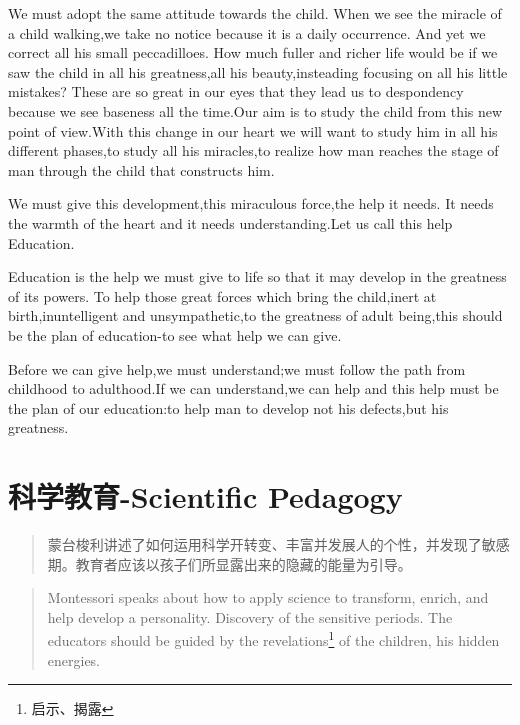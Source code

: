 \documentclass[lang=cn,10pt]{elegantbook}
\begin{document}
We must adopt the same attitude towards the child. When we see the miracle of a child walking,we take no notice because it is a daily occurrence. And yet we correct all his small peccadilloes. How much fuller and richer life would be if we saw the child in all his greatness,all his beauty,insteading focusing on all his little mistakes? These are so great in our eyes that they lead us to despondency because we see baseness all the time.Our aim is to study the child from this new point of view.With this change in our heart we will want to study him in all his different phases,to study all his miracles,to realize how man reaches the stage of man through the child that constructs him.

We must give this development,this miraculous force,the help it needs. It needs the warmth of the heart and it needs understanding.Let us call this help Education.

Education is the help we must give to life so that it may develop in the greatness of its powers. To help those great forces which bring the child,inert at birth,inuntelligent and unsympathetic,to the greatness of adult being,this should be the plan of education-to see what help we can give.

Before we can give help,we must understand;we must follow the path from childhood to adulthood.If we can understand,we can help and this help must be the plan of our education:to help man to develop not his defects,but his greatness.

\chapter{科学教育-Scientific Pedagogy}

\begin{quote}
{\small 蒙台梭利讲述了如何运用科学开转变、丰富并发展人的个性，并发现了敏感期。教育者应该以孩子们所显露出来的隐藏的能量为引导。}
\end{quote}

\begin{tcolorbox}
\begin{quote}
{\small Montessori speaks about how to apply science to transform, enrich, and help develop a personality. Discovery of the sensitive periods. The educators should be guided by the revelations\footnote{启示、揭露} of the children, his hidden energies.}
\end{quote}
\end{tcolorbox}
\end{document}
